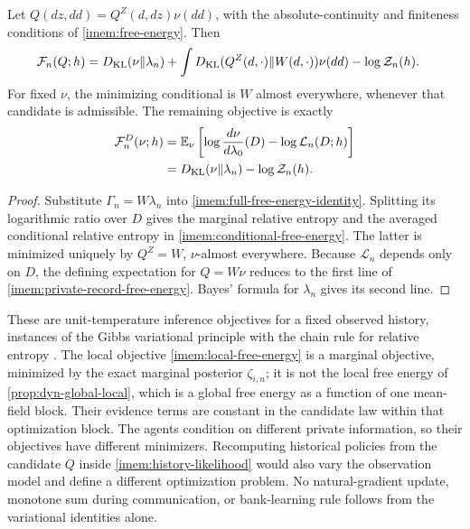 Let $Q(dz,dd)=Q^Z(d,dz)\nu(dd)$, with the absolute-continuity and finiteness conditions of \cref{imem:free-energy}. Then
\begin{equation}
 \begin{split}
 \mathcal F_n(Q;h)
 ={}&D_{\mathrm{KL}}(\nu\Vert\lambda_n)
 +\int D_{\mathrm{KL}}(Q^Z(d,\cdot)\Vert W(d,\cdot))\nu(dd)
 -\log\mathcal Z_n(h).
 \end{split}
 \label{imem:conditional-free-energy}
\end{equation}
For fixed $\nu$, the minimizing conditional is $W$ almost everywhere, whenever that candidate is admissible. The remaining objective is exactly
\begin{equation}
 \begin{split}
 \mathcal F_n^D(\nu;h)
 &=\mathbb E_\nu\left[
 \log\frac{d\nu}{d\lambda_0}(D)-\log\mathcal L_n(D;h)\right]\\
 &=D_{\mathrm{KL}}(\nu\Vert\lambda_n)-\log\mathcal Z_n(h).
 \end{split}
 \label{imem:private-record-free-energy}
\end{equation}
\begin{proof}
Substitute $\Gamma_n=W\lambda_n$ into \cref{imem:full-free-energy-identity}. Splitting its logarithmic ratio over $D$ gives the marginal relative entropy and the averaged conditional relative entropy in \cref{imem:conditional-free-energy}. The latter is minimized uniquely by $Q^Z=W$, $\nu$-almost everywhere. Because $\mathcal L_n$ depends only on $D$, the defining expectation for $Q=W\nu$ reduces to the first line of \cref{imem:private-record-free-energy}. Bayes' formula for $\lambda_n$ gives its second line.
\end{proof}

These are unit-temperature inference objectives for a fixed observed history, instances of the Gibbs variational principle with the chain rule for relative entropy \citep{DonskerVaradhan1975}. The local objective \cref{imem:local-free-energy} is a marginal objective, minimized by the exact marginal posterior $\zeta_{i,n}$; it is not the local free energy of \cref{prop:dyn-global-local}, which is a global free energy as a function of one mean-field block. Their evidence terms are constant in the candidate law within that optimization block. The agents condition on different private information, so their objectives have different minimizers. Recomputing historical policies from the candidate $Q$ inside \cref{imem:history-likelihood} would also vary the observation model and define a different optimization problem. No natural-gradient update, monotone sum during communication, or bank-learning rule follows from the variational identities alone.

